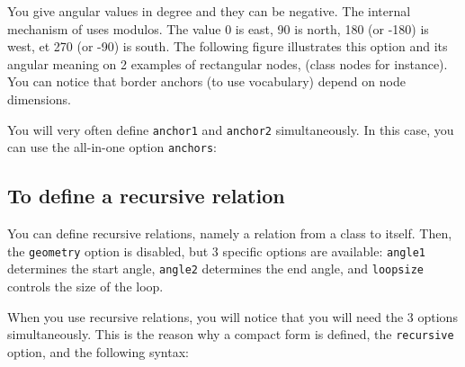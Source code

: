 \documentclass[a4paper,11pt]{report}
\begin{document}
\medskip

You give angular values in degree and they can be negative. The internal mechanism of \TikZ uses modulos. The value 0 is east, 90 is north, 180 (or -180) is west, et 270 (or -90) is south. The following figure illustrates this option and its angular meaning on 2 examples of rectangular nodes, (class nodes for instance). You can notice that border anchors (to use \TikZ vocabulary) depend on node dimensions.

\begin{center}
\end{center}

You will very often define {\tt anchor1} and {\tt anchor2} simultaneously. In this case, you can use the all-in-one option \hypertarget{anchors}{{\tt anchors}}:

\medskip

\begin{minipage}{0.6\textwidth}
	
\end{minipage}
\begin{minipage}{0.4\textwidth}
	\begin{center}
	\end{center}
\end{minipage}

\subsection{To define a recursive relation}\label{ss.relrec}

You can define recursive relations, namely a relation from a class to itself. Then, the
	{\tt geometry} option is disabled, but 3 specific options are available: {\tt angle1} determines
the start angle, {\tt angle2} determines the end angle, and {\tt loopsize} controls the size of the loop.

\medskip

\begin{minipage}{0.5\textwidth}
	
\end{minipage}
\begin{minipage}{0.4\textwidth}
	\begin{center}
	\end{center}
\end{minipage}

\medskip

When you use recursive relations, you will notice that you will need the 3 options simultaneously. This is the reason why a compact form is defined, the {\tt recursive} option, and the following syntax:
\end{document}
